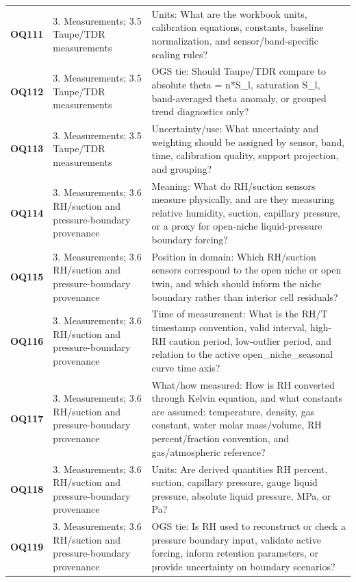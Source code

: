 \begin{longtable}{@{}L{0.10\textwidth} L{0.23\textwidth} L{0.59\textwidth}@{}}
\addlinespace[0.16em]
\textbf{OQ111} & 3. Measurements; 3.5 Taupe/TDR measurements & Units: What are the workbook units, calibration equations, constants, baseline normalization, and sensor/band-specific scaling rules?\\
\addlinespace[0.16em]
\textbf{OQ112} & 3. Measurements; 3.5 Taupe/TDR measurements & OGS tie: Should Taupe/TDR compare to absolute theta = n*S\_l, saturation S\_l, band-averaged theta anomaly, or grouped trend diagnostics only?\\
\addlinespace[0.16em]
\textbf{OQ113} & 3. Measurements; 3.5 Taupe/TDR measurements & Uncertainty/use: What uncertainty and weighting should be assigned by sensor, band, time, calibration quality, support projection, and grouping?\\
\addlinespace[0.16em]
\textbf{OQ114} & 3. Measurements; 3.6 RH/suction and pressure-boundary provenance & Meaning: What do RH/suction sensors measure physically, and are they measuring relative humidity, suction, capillary pressure, or a proxy for open-niche liquid-pressure boundary forcing?\\
\addlinespace[0.16em]
\textbf{OQ115} & 3. Measurements; 3.6 RH/suction and pressure-boundary provenance & Position in domain: Which RH/suction sensors correspond to the open niche or open twin, and which should inform the niche boundary rather than interior cell residuals?\\
\addlinespace[0.16em]
\textbf{OQ116} & 3. Measurements; 3.6 RH/suction and pressure-boundary provenance & Time of measurement: What is the RH/T timestamp convention, valid interval, high-RH caution period, low-outlier period, and relation to the active open\_niche\_seasonal curve time axis?\\
\addlinespace[0.16em]
\textbf{OQ117} & 3. Measurements; 3.6 RH/suction and pressure-boundary provenance & What/how measured: How is RH converted through Kelvin equation, and what constants are assumed: temperature, density, gas constant, water molar mass/volume, RH percent/fraction convention, and gas/atmospheric reference?\\
\addlinespace[0.16em]
\textbf{OQ118} & 3. Measurements; 3.6 RH/suction and pressure-boundary provenance & Units: Are derived quantities RH percent, suction, capillary pressure, gauge liquid pressure, absolute liquid pressure, MPa, or Pa?\\
\addlinespace[0.16em]
\textbf{OQ119} & 3. Measurements; 3.6 RH/suction and pressure-boundary provenance & OGS tie: Is RH used to reconstruct or check a pressure boundary input, validate active forcing, inform retention parameters, or provide uncertainty on boundary scenarios?\\

\end{longtable}
